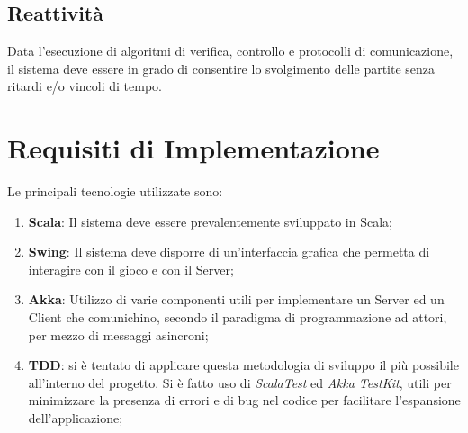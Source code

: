 \subsection{Reattivit\`a}
Data l'esecuzione di algoritmi di verifica, controllo e protocolli di comunicazione, il sistema deve essere in grado di consentire lo svolgimento delle partite senza ritardi e/o vincoli di tempo.

\section{Requisiti di Implementazione}
Le principali tecnologie utilizzate sono:
\begin{enumerate}
\item \textbf{Scala}: Il sistema deve essere prevalentemente sviluppato in Scala;
\item \textbf{Swing}: Il sistema deve disporre di un’interfaccia grafica che permetta di interagire con il gioco e con il Server;
\item \textbf{Akka}: Utilizzo di varie componenti  utili per implementare un Server ed un Client che comunichino, secondo il paradigma di programmazione ad attori, per mezzo di messaggi asincroni;
\item \textbf{TDD}: si è tentato di applicare questa metodologia di sviluppo il più possibile all'interno del progetto. Si è fatto uso di \textit{ScalaTest} ed \textit{Akka TestKit}, utili per minimizzare la presenza di errori e di bug nel codice per facilitare l’espansione dell'applicazione;
\end{enumerate}